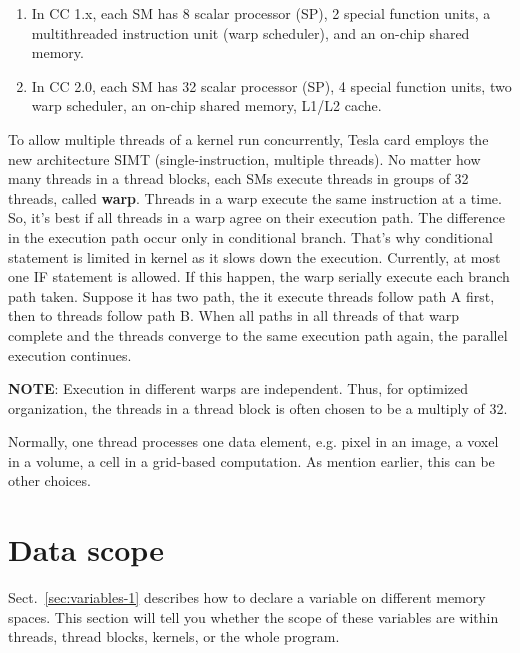 \begin{enumerate}
\item In CC 1.x, each SM has 8 scalar processor (SP), 2 special
  function units, a multithreaded instruction unit (warp scheduler),
  and an on-chip shared memory.
\item In CC 2.0, each SM has 32 scalar processor (SP), 4 special
  function units, two warp scheduler, an on-chip shared memory, L1/L2
  cache. 
\end{enumerate}
To allow multiple threads of a kernel run concurrently, Tesla card
employs the new architecture SIMT (single-instruction, multiple
threads). No matter how many threads in a thread blocks, each SMs
execute threads in groups of 32 threads, called {\bf warp}. Threads in
a warp execute the same instruction at a time. So, it's best if all
threads in a warp agree on their execution path. The difference in the
execution path occur only in conditional branch. That's why
conditional statement is limited in kernel as it slows down the
execution. Currently, at most one IF statement is allowed. If this
happen, the warp serially execute each branch path taken. Suppose it
has two path, the it execute threads follow path A first, then to
threads follow path B. When all paths in all threads of that warp
complete and the threads converge to the same execution path again,
the parallel execution continues.

{\bf NOTE}: Execution in different warps are independent. Thus, for
optimized organization, the threads in a thread block is often chosen
to be a multiply of 32.

Normally, one thread processes one data element, e.g. pixel in an
image, a voxel in a volume, a cell in a grid-based computation. 
As mention earlier, this can be other choices. 


\section{Data scope}
\label{sec:data-scope}

Sect.~\ref{sec:variables-1} describes how to declare a variable on
different memory spaces. This section will tell you whether the scope
of these variables are within threads, thread blocks, kernels, or the
whole program.

